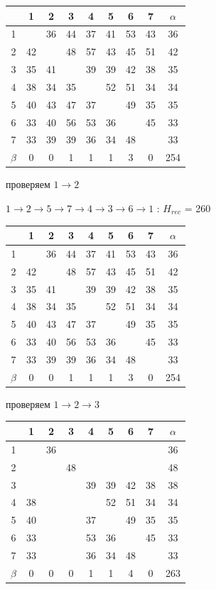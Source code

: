 \documentclass[russian]{article}
\begin{document}
\begin{tabular}{|c|c|c|c|c|c|c|c|c|}\hline
& 1& 2& 3& 4& 5& 6& 7& $\alpha$\\\hline
1& & 36& 44& 37& 41& 53& 43& 36\\\hline
2& 42& & 48& 57& 43& 45& 51& 42\\\hline
3& 35& 41& & 39& 39& 42& 38& 35\\\hline
4& 38& 34& 35& & 52& 51& 34& 34\\\hline
5& 40& 43& 47& 37& & 49& 35& 35\\\hline
6& 33& 40& 56& 53& 36& & 45& 33\\\hline
7& 33& 39& 39& 36& 34& 48& & 33\\\hline
$\beta$& 0& 0& 1& 1& 1& 3& 0& 254\\\hline
\end{tabular}

проверяем 
$1 \to 2$

$1 \to 2 \to 5 \to 7 \to 4 \to 3 \to 6 \to 1$ : $H_{rec}$ = 260

\begin{tabular}{|c|c|c|c|c|c|c|c|c|}\hline
& 1& 2& 3& 4& 5& 6& 7& $\alpha$\\\hline
1& & 36& 44& 37& 41& 53& 43& 36\\\hline
2& 42& & 48& 57& 43& 45& 51& 42\\\hline
3& 35& 41& & 39& 39& 42& 38& 35\\\hline
4& 38& 34& 35& & 52& 51& 34& 34\\\hline
5& 40& 43& 47& 37& & 49& 35& 35\\\hline
6& 33& 40& 56& 53& 36& & 45& 33\\\hline
7& 33& 39& 39& 36& 34& 48& & 33\\\hline
$\beta$& 0& 0& 1& 1& 1& 3& 0& 254\\\hline
\end{tabular}

проверяем 
$1 \to 2 \to 3$

\begin{tabular}{|c|c|c|c|c|c|c|c|c|}\hline
& 1& 2& 3& 4& 5& 6& 7& $\alpha$\\\hline
1& & 36& & & & & & 36\\\hline
2& & & 48& & & & & 48\\\hline
3& & & & 39& 39& 42& 38& 38\\\hline
4& 38& & & & 52& 51& 34& 34\\\hline
5& 40& & & 37& & 49& 35& 35\\\hline
6& 33& & & 53& 36& & 45& 33\\\hline
7& 33& & & 36& 34& 48& & 33\\\hline
$\beta$& 0& 0& 0& 1& 1& 4& 0& 263\\\hline
\end{tabular}
\end{document}
